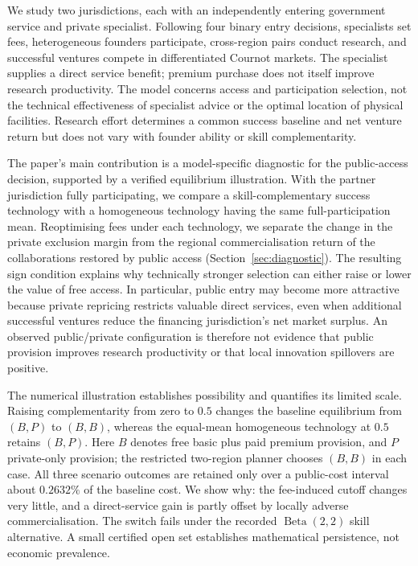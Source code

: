 \documentclass[11pt]{article}
\begin{document}
We study two jurisdictions, each with an independently entering government service and private specialist.
Following four binary entry decisions, specialists set fees, heterogeneous founders participate, cross-region pairs conduct research, and successful ventures compete in differentiated Cournot markets.
The specialist supplies a direct service benefit; premium purchase does not itself improve research productivity.
The model concerns access and participation selection, not the technical effectiveness of specialist advice or the optimal location of physical facilities.
Research effort determines a common success baseline and net venture return but does not vary with founder ability or skill complementarity.

The paper's main contribution is a model-specific diagnostic for the public-access decision, supported by a verified equilibrium illustration.
With the partner jurisdiction fully participating, we compare a skill-complementary success technology with a homogeneous technology having the same full-participation mean.
Reoptimising fees under each technology, we separate the change in the private exclusion margin from the regional commercialisation return of the collaborations restored by public access (Section~\ref{sec:diagnostic}).
The resulting sign condition explains why technically stronger selection can either raise or lower the value of free access.
In particular, public entry may become more attractive because private repricing restricts valuable direct services, even when additional successful ventures reduce the financing jurisdiction's net market surplus.
An observed public/private configuration is therefore not evidence that public provision improves research productivity or that local innovation spillovers are positive.

The numerical illustration establishes possibility and quantifies its limited scale.
Raising complementarity from zero to $0.5$ changes the baseline equilibrium from $(B,P)$ to $(B,B)$, whereas the equal-mean homogeneous technology at $0.5$ retains $(B,P)$.
Here $B$ denotes free basic plus paid premium provision, and $P$ private-only provision; the restricted two-region planner chooses $(B,B)$ in each case.
All three scenario outcomes are retained only over a public-cost interval about $0.2632\%$ of the baseline cost.
We show why: the fee-induced cutoff changes very little, and a direct-service gain is partly offset by locally adverse commercialisation.
The switch fails under the recorded $\operatorname{Beta}(2,2)$ skill alternative.
A small certified open set establishes mathematical persistence, not economic prevalence.
\end{document}
